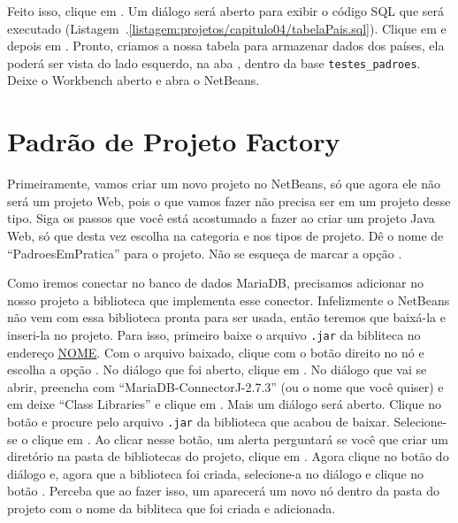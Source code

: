 Feito isso, clique em . Um diálogo será aberto para exibir o código SQL que será executado (Listagem~\thechapter.\ref{listagem:projetos/capitulo04/tabelaPais.sql}). Clique em  e depois em . Pronto, criamos a nossa tabela para armazenar dados dos países, ela poderá ser vista do lado esquerdo, na aba , dentro da base \texttt{testes\_padroes}. Deixe o Workbench aberto e abra o NetBeans. 


\section{Padrão de Projeto Factory}

Primeiramente, vamos criar um novo projeto no NetBeans, só que agora ele não será um projeto Web, pois o que vamos fazer não precisa ser em um projeto desse tipo. Siga os passos que você está acostumado a fazer ao criar um projeto Java Web, só que desta vez escolha  na categoria e  nos tipos de projeto. Dê o nome de ``PadroesEmPratica'' para o projeto. Não se esqueça de marcar a opção .

Como iremos conectar no banco de dados MariaDB, precisamos adicionar no nosso projeto a biblioteca que implementa esse conector. Infelizmente o NetBeans não vem com essa biblioteca pronta para ser usada, então teremos que baixá-la e inseri-la no projeto. Para isso, primeiro baixe o arquivo \texttt{.jar} da bibliteca no endereço \url{NOME}. Com o arquivo baixado, clique com o botão direito no nó  e escolha a opção . No diálogo que foi aberto, clique em . No diálogo que vai se abrir, preencha  com ``MariaDB-ConnectorJ-2.7.3'' (ou o nome que você quiser) e em  deixe ``Class Libraries'' e clique em . Mais um diálogo será aberto. Clique no botão  e procure pelo arquivo \texttt{.jar} da biblioteca que acabou de baixar. Selecione-se o clique em . Ao clicar nesse botão, um alerta perguntará se você que criar um diretório na pasta de bibliotecas do projeto, clique em . Agora clique no botão  do diálogo  e, agora que a biblioteca foi criada, selecione-a no diálogo  e clique no botão . Perceba que ao fazer isso, um aparecerá um novo nó dentro da pasta  do projeto com o nome da bibliteca que foi criada e adicionada.

